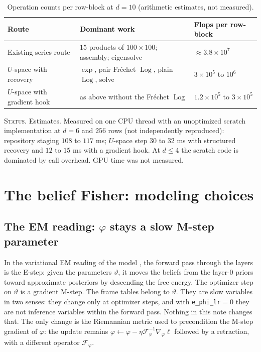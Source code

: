 \documentclass[11pt]{article}
\theoremstyle{definition}
\theoremstyle{remark}
\newcommand{\Log}{\operatorname{Log}}
\newcommand{\status}[1]{\par\smallskip\noindent\textsc{Status.} #1\par\smallskip}
\begin{document}
\begin{table}[h]
\centering
\small
\begin{tabular}{lll}
\toprule
Route & Dominant work & Flops per row-block\\
\midrule
Existing series route & $15$ products of $100\times100$; assembly; eigensolve & $\approx3.8\times10^7$\\
$U$-space with recovery & $\exp$, pair Fr\'echet $\Log$, plain $\Log$, solve & $3\times10^5$ to $10^6$\\
$U$-space with gradient hook & as above without the Fr\'echet $\Log$ & $1.2\times10^5$ to $3\times10^5$\\
\bottomrule
\end{tabular}
\caption{Operation counts per row-block at $d=10$ (arithmetic estimates, not measured).}\label{tab:cost-pullback}
\end{table}

\status{Estimates. Measured on one CPU thread with an unoptimized scratch implementation at $d=6$ and $256$ rows (not independently reproduced): repository staging $108$ to $117$ ms; $U$-space step $30$ to $32$ ms with structured recovery and $12$ to $15$ ms with a gradient hook. At $d\le4$ the scratch code is dominated by call overhead. GPU time was not measured.}

\section{The belief Fisher: modeling choices}\label{sec:em}

\subsection{The EM reading: \texorpdfstring{$\varphi$}{phi} stays a slow M-step parameter}

In the variational EM reading of the model \cite{Dempster1977,NealHinton1998}, the forward pass through the layers is the E-step: given the parameters $\vartheta$, it moves the beliefs from the layer-0 priors toward approximate posteriors by descending the free energy. The optimizer step on $\vartheta$ is a gradient M-step. The frame tables belong to $\vartheta$. They are slow variables in two senses: they change only at optimizer steps, and with \texttt{e\_phi\_lr}$=0$ they are not inference variables within the forward pass. Nothing in this note changes that. The only change is the Riemannian metric used to precondition the M-step gradient of $\varphi$: the update remains $\varphi\leftarrow\varphi-\eta\mathcal{F}_\varphi^{-1}\nabla_\varphi\ell$ followed by a retraction, with a different operator $\mathcal{F}_\varphi$.
\end{document}
